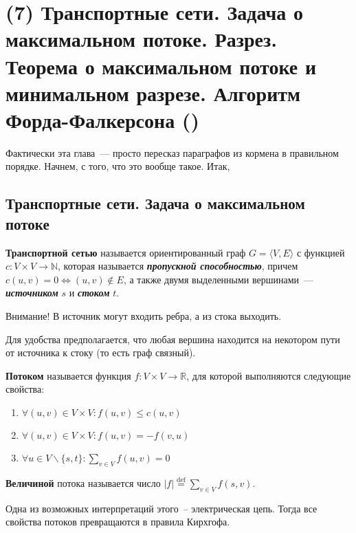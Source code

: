\let\bf\bfseries
\let\it\itshape
\section{(7) Транспортные сети. Задача о максимальном потоке. Разрез. Теорема о максимальном потоке и минимальном разрезе. Алгоритм Форда-Фалкерсона (\groth)}
Фактически эта глава~--- просто пересказ параграфов из кормена в правильном порядке. Начнем, с того, что это вообще такое. Итак,
\subsection{Транспортные сети. Задача о максимальном потоке}
\begin{definition}
	{\bf Транспортной сетью} называется ориентированный граф $G=\langle V,E\rangle$ с функцией $c\colon V\times V\to\mathbb{N}$, которая называется {\bf\it пропускной способностью}, причем $c(u,v)=0\iff (u,v)\not\in E$, а также двумя выделенными вершинами~--- {\bf\it источником} $s$ и {\bf\it стоком} $t$.
\end{definition}
Внимание! В источник могут входить ребра, а из стока выходить.

Для удобства предполагается, что любая вершина находится на некотором пути от источника к стоку (то есть граф связный).
\begin{example}
	\needpicture
\end{example}
\begin{definition}
	{\bfseries Потоком} называется функция $f\colon V\times V\to\mathbb{R}$, для которой выполняются следующие свойства:
	\begin{enumerate}
		\item $\forall(u,v)\in V\times V\colon f(u,v)\le c(u,v)$
		\item $\forall(u,v)\in V\times V\colon f(u,v)=-f(v,u)$
		\item $\forall u\in V\smallsetminus\{s,t\}\colon \sum_{v\in V} f(u,v)=0$
	\end{enumerate}
	{\bfseries Величиной} потока называется число $|f|\overset{\mathrm{def}}{=}\sum_{v\in V}f(s,v)$.
\end{definition}
Одна из возможных интерпретаций этого~-- электрическая цепь. Тогда все свойства потоков превращаются в правила Кирхгофа.

